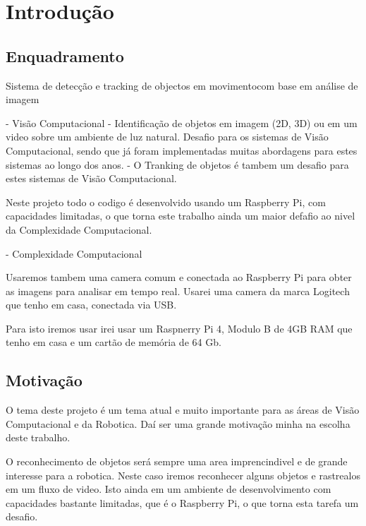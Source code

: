 \chapter{Introdução}
\label{chap:intro}


\section{Enquadramento}
\label{sec:amb}

Sistema de detecção e tracking de objectos em movimentocom base em análise de imagem

- Visão Computacional
- Identificação de objetos em imagem (2D, 3D) ou em um video sobre um ambiente de luz natural.
Desafio para os sistemas de Visão Computacional, sendo que já foram implementadas muitas abordagens para estes sistemas ao longo dos anos.
- O Tranking de objetos é tambem um desafio para estes sistemas de Visão Computacional.

Neste projeto todo o codigo é desenvolvido usando um Raspberry Pi, com capacidades limitadas, o que torna este trabalho ainda um maior defafio ao nivel da Complexidade Computacional.

- Complexidade Computacional 

Usaremos tambem uma camera comum e conectada ao Raspberry Pi para obter as imagens para analisar em tempo real. Usarei uma camera da marca Logitech que tenho em casa, conectada via USB.

Para isto iremos usar irei usar um Raspnerry Pi 4, Modulo B de 4GB RAM que tenho em casa e um cartão de memória de 64 Gb.

\section{Motivação}
\label{sec:mot}

O tema deste projeto é um tema atual e muito importante para as áreas de Visão Computacional e da Robotica. Daí ser uma grande motivação minha na escolha deste trabalho.

O reconhecimento de objetos será sempre uma area imprencindivel e de grande interesse para a robotica. Neste caso iremos reconhecer alguns objetos e rastrealos em um fluxo de video. 
Isto ainda em um ambiente de desenvolvimento com capacidades bastante limitadas, que é o Raspberry Pi, o que torna esta tarefa um desafio. 

